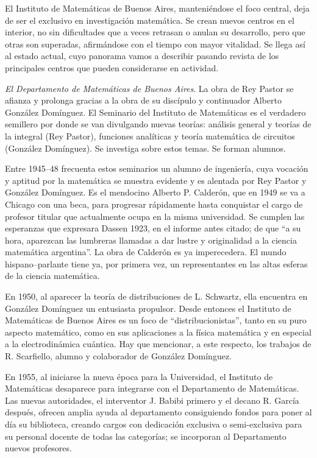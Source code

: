 El Instituto de Matemáticas de Buenos Aires, manteniéndose el foco central,
deja de ser el exclusivo en investigación matemática. Se crean nuevos centros
en el interior, no sin dificultades que a veces retrasan o anulan su
desarrollo, pero que otras son superadas, afirmándose con el tiempo con mayor
vitalidad. Se llega así al estado actual, cuyo panorama vamos a describir
pasando revista de los principales centros que pueden considerarse en
actividad. 

\emph{El Departamento de Matemáticas de Buenos Aires}. La obra de Rey Pastor se
afianza y prolonga gracias a la obra de su discípulo y continuador Alberto
González Domínguez. El Seminario del Instituto de Matemáticas es el verdadero
semillero por donde se van divulgando nuevas teorías: análisis general y
teorías de la integral (Rey Pastor), funciones analíticas y teoría matemática
de circuitos (González Domínguez). Se investiga sobre estos temas. Se forman
alumnos.

Entre 1945--48 frecuenta estos seminarios un alumno de ingeniería, cuya
vocación y aptitud por la matemática se muestra evidente y es alentada por Rey
Pastor y González Domínguez. Es el mendocino Alberto P. Calderón, que en 1949
se va a Chicago con una beca, para progresar rápidamente hasta conquistar el
cargo de profesor titular que actualmente ocupa en la misma universidad. Se
cumplen las esperanzas que expresara Dassen 1923, en el informe antes citado;
de que ``a su hora, aparezcan las lumbreras llamadas a dar lustre y
originalidad a la ciencia matemática argentina''. La obra de Calderón es ya
imperecedera. El mundo hispano--parlante tiene ya, por primera vez, un
representantes en las altas esferas de la ciencia matemática.

En 1950, al aparecer la teoría de distribuciones de L. Schwartz, ella encuentra
en González Domínguez un entusiasta propulsor. Desde entonces el Instituto de
Matemáticas de Buenos Aires es un foco de ``distribucionistas'', tanto en su
puro aspecto matemático, como en sus aplicaciones a la física matemática y en
especial a la electrodinámica cuántica. Hay que mencionar, a este respecto, los
trabajos de R. Scarfiello, alumno y colaborador de González Domínguez.

En 1955, al iniciarse la nueva época para la Universidad, el Instituto de
Matemáticas desaparece para integrarse con el Departamento de Matemáticas. Las
nuevas autoridades, el interventor J. Babibi primero y el decano R. García
después, ofrecen amplia ayuda al departamento consiguiendo fondos para poner al
día su biblioteca, creando cargos con dedicación exclusiva o semi-exclusiva
para su personal docente de todas las categorías; se incorporan al Departamento
nuevos profesores. 

